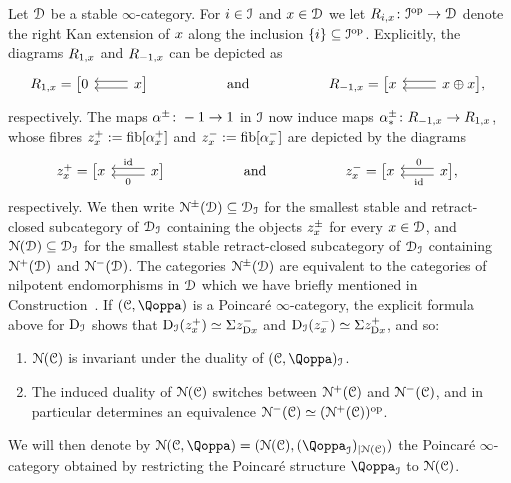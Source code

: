 \begin{construction}
\label{construction:E}%
Let $\mathcal{D}$ be a stable $\infty$-category.
For \(i \in \mathcal{I}\) and \(x \in \mathcal{D}\) we let \(R_{i,x}\colon \mathcal{I}^\mathrm{op} \to \mathcal{D}\) denote the right Kan extension of \(x\) along the inclusion \(\{i\} \subseteq \mathcal{I}^\mathrm{op}\). Explicitly, the diagrams \(R_{1,x}\) and \(R_{-1,x}\) can be depicted as
\[
\begin{tikzcd}[row sep=2pt]
R_{1,x} = \big[0 & \ar[l,shift left]\ar[l,shift right] \x \big] && \text{and} && R_{-1,x} = \big[\x & \ar[l,shift left]\ar[l,shift right] \x \oplus \x \big], \
\end{tikzcd}
\]
respectively. 
The maps \(\alpha^{\pm}\colon -1 \to 1\) in $\mathcal{I}$ now induce maps \(\alpha^{\pm}_{\ast}\colon R_{-1,x} \to R_{1,x}\), whose fibres \(z^+_{x} := \operatorname{fib}[\alpha^+_{x}]\) and \(z^-_x := \operatorname{fib}[\alpha^-_{x}]\) are depicted by the diagrams
\[
\begin{tikzcd}[row sep = 2ex]
z^+_x = \big[\x & \ar[l,shift left,"0"]\ar[l,shift right,"\id"'] \x\big] && \text{and} && z^-_x = \big[ \x & \ar[l,shift left,"\id",pos=0.45]\ar[l,shift right,"0"',pos=0.45] \x\big] , \
\end{tikzcd}
\]
respectively.
We then write \(\mathcal{N}^{\pm}(\mathcal{D}) \subseteq \mathcal{D}_{\mathcal{I}}\) for the smallest stable and retract-closed subcategory of $\mathcal{D}_{\mathcal{I}}$ containing the objects \(z^{\pm}_{x}\) for every \(x \in \mathcal{D}\), and \(\mathcal{N}(\mathcal{D}) \subseteq \mathcal{D}_{\mathcal{I}}\) for the smallest stable retract-closed subcategory of \(\mathcal{D}_{\mathcal{I}}\) containing $\mathcal{N}^+(\mathcal{D})$ and $\mathcal{N}^-(\mathcal{D})$. The categories $\mathcal{N}^{\pm}(\mathcal{D})$ are equivalent to the categories of nilpotent endomorphisms in $\mathcal{D}$ which we have briefly mentioned in Construction~. If $(\C,\QF)$ is a Poincar\'e $\infty$-category,
the explicit formula above for \(\mathrm{D}_{\mathcal{I}}\) shows that \(\mathrm{D}_{\mathcal{I}}(z^+_{x}) \simeq \Sigma z^-_{\mathrm{D}x}\) and \(\mathrm{D}_{\mathcal{I}}(z^-_{x}) \simeq \Sigma z^+_{\mathrm{D} x}\), and so:
\begin{enumerate}
\item
\(\mathcal{N}(\mathcal C)\) is %
invariant under the duality of $(\C,\QF)_\I$.
\item
The induced duality of $\mathcal{N}(\mathcal C)$ switches between $\mathcal{N}^+(\mathcal C)$ and $\mathcal{N}^-(\mathcal C)$, and in particular determines an equivalence $\mathcal{N}^-(\mathcal C) \simeq (\mathcal{N}^+(\mathcal C))^\mathrm{op}$.
\end{enumerate}
We will then denote by $\cN(\C,\QF) = (\cN(\C),(\QF_\I)_{|\cN(\C)})$ the Poincaré $\infty$-category obtained by restricting the Poincaré structure $\QF_\I$ to $\mathcal{N}(\mathcal C)$.
\end{construction}


